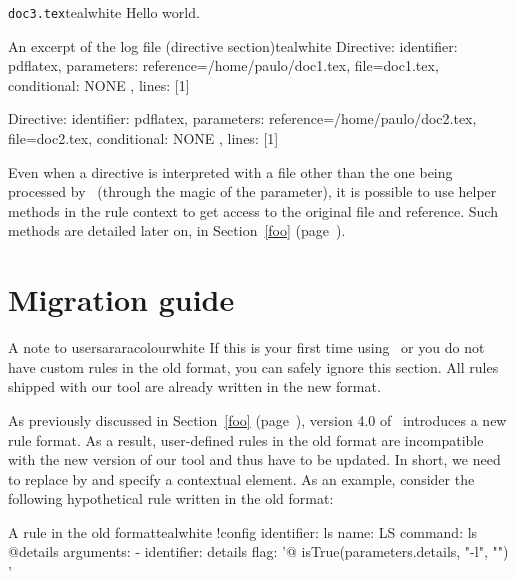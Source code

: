 \begin{codebox}{\texttt{doc3.tex}}{teal}{\icnote}{white}
Hello world.
\bye
\end{codebox}

\begin{codebox}{An excerpt of the log file (directive section)}{teal}{\icnote}{white}
Directive: { identifier: pdflatex, parameters:
{reference=/home/paulo/doc1.tex, file=doc1.tex},
conditional: { NONE }, lines: [1] }

Directive: { identifier: pdflatex, parameters:
{reference=/home/paulo/doc2.tex, file=doc2.tex},
conditional: { NONE }, lines: [1] }
\end{codebox}

Even when a directive is interpreted with a file other than the one being processed by \arara\ (through the magic of the  parameter), it is possible to use helper methods in the rule context to get access to the original file and reference. Such methods are detailed later on, in Section~\ref{foo} (page~\pageref{foo}).

\section{Migration guide}
\label{sec:migrationguide}

\begin{messagebox}{A note to users}{araracolour}{\icattention}{white}
If this is your first time using \arara\ or you do not have custom rules in the old format, you can safely ignore this section. All rules shipped with our tool are already written in the new format.
\end{messagebox}

As previously discussed in Section~\ref{foo} (page~\pageref{foo}), version 4.0 of \arara\ introduces a new rule format. As a result, user-defined rules in the old format are incompatible with the new version of our tool and thus have to be updated. In short, we need to replace  by  and specify a contextual element. As an example, consider the following hypothetical rule  written in the old format:

\begin{codebox}{A rule in the old format}{teal}{\icnote}{white}
!config
identifier: ls
name: LS
command: ls @{details}
arguments:
- identifier: details
  flag: '@{ isTrue(parameters.details, "-l", "") }'
\end{codebox}

